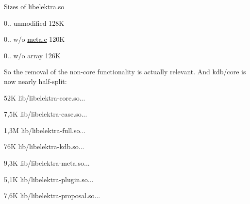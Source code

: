 Sizes of libelektra.\+so


\begin{DoxyItemize}
\item 0.. unmodified 128K
\item 0.. w/o \hyperlink{meta_8c}{meta.\+c} 120K
\item 0.. w/o array 126K
\end{DoxyItemize}

So the removal of the non-\/core functionality is actually relevant. And kdb/core is now nearly half-\/split\+:


\begin{DoxyItemize}
\item 52K lib/libelektra-\/core.\+so...
\item 7,5K lib/libelektra-\/ease.\+so...
\item 1,3M lib/libelektra-\/full.\+so...
\item 76K lib/libelektra-\/kdb.\+so...
\item 9,3K lib/libelektra-\/meta.\+so...
\item 5,1K lib/libelektra-\/plugin.\+so...
\item 7,6K lib/libelektra-\/proposal.\+so... 
\end{DoxyItemize}